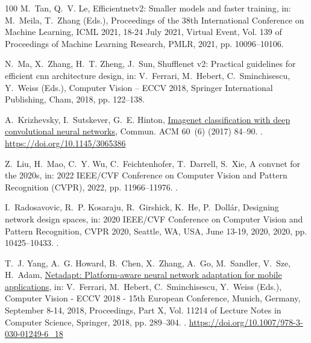 \documentclass[final,3p,times,twocolumn]{elsarticle}
\begin{document}
\begin{thebibliography}{100}
M.~Tan, Q.~V. Le, Efficientnetv2: Smaller models and faster training, in:
  M.~Meila, T.~Zhang (Eds.), Proceedings of the 38th International Conference
  on Machine Learning, {ICML} 2021, 18-24 July 2021, Virtual Event, Vol. 139 of
  Proceedings of Machine Learning Research, {PMLR}, 2021, pp. 10096--10106.

N.~Ma, X.~Zhang, H.~T. Zheng, J.~Sun, Shufflenet v2: Practical guidelines for
  efficient cnn architecture design, in: V.~Ferrari, M.~Hebert,
  C.~Sminchisescu, Y.~Weiss (Eds.), Computer Vision -- ECCV 2018, Springer
  International Publishing, Cham, 2018, pp. 122--138.

A.~Krizhevsky, I.~Sutskever, G.~E. Hinton,
  \href{https://doi.org/10.1145/3065386}{Imagenet classification with deep
  convolutional neural networks}, Commun. ACM 60~(6) (2017) 84–90.
\newblock \href {https://doi.org/10.1145/3065386} {}.
\newline\urlprefix\url{https://doi.org/10.1145/3065386}

Z.~Liu, H.~Mao, C.~Y. Wu, C.~Feichtenhofer, T.~Darrell, S.~Xie, A convnet for
  the 2020s, in: 2022 IEEE/CVF Conference on Computer Vision and Pattern
  Recognition (CVPR), 2022, pp. 11966--11976.
\newblock \href {https://doi.org/10.1109/CVPR52688.2022.01167}
  {}.

I.~Radosavovic, R.~P. Kosaraju, R.~Girshick, K.~He, P.~Dollár, Designing
  network design spaces, in: 2020 {IEEE/CVF} Conference on Computer Vision and
  Pattern Recognition, {CVPR} 2020, Seattle, WA, USA, June 13-19, 2020, 2020,
  pp. 10425--10433.
\newblock \href {https://doi.org/10.1109/CVPR42600.2020.01044}
  {}.

T.~J. Yang, A.~G. Howard, B.~Chen, X.~Zhang, A.~Go, M.~Sandler, V.~Sze,
  H.~Adam, \href{https://doi.org/10.1007/978-3-030-01249-6\_18}{Netadapt:
  Platform-aware neural network adaptation for mobile applications}, in:
  V.~Ferrari, M.~Hebert, C.~Sminchisescu, Y.~Weiss (Eds.), Computer Vision -
  {ECCV} 2018 - 15th European Conference, Munich, Germany, September 8-14,
  2018, Proceedings, Part {X}, Vol. 11214 of Lecture Notes in Computer Science,
  Springer, 2018, pp. 289--304.
\newblock \href {https://doi.org/10.1007/978-3-030-01249-6\_18}
  {}.
\newline\urlprefix\url{https://doi.org/10.1007/978-3-030-01249-6\_18}


\end{thebibliography}
\end{document}
